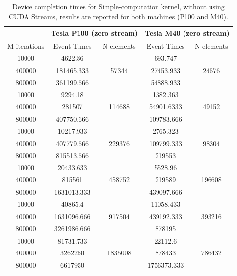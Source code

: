 \begin{table}	
	\centering
	\begin{tabular}{ | c ||  c | c  || c | c | } 
		\hline
		&  \multicolumn{2}{c}{\textbf{Tesla P100 (zero stream)}} & \multicolumn{2}{c}{\textbf{Tesla M40 (zero stream)}}\\ [0.5ex]
		\hline
		M iterations & Event Times & N elements    &    Event Times & N elements  \\
		\hline\hline
		
		
		10000 &	4622.86 &	\multirow{3}{*}{57344}&	693.747&	\multirow{3}{*}{24576}\\
		400000 & 181465.333&	&	27453.933&	\\
		800000 &	361199.666&	&	54888.933&	\\
		\hline
		10000 &	9294.18&	\multirow{3}{*}{114688}&	1382.363&	\multirow{3}{*}{49152}\\
		400000 &	281507 &	&	54901.6333&	\\
		800000 &	407750.666&	&	109783.666&	\\
		\hline
		10000 &	10217.933&	\multirow{3}{*}{229376}&	2765.323&	\multirow{3}{*}{98304}\\
		400000 &	407779.666&	&	109799.333&	\\
		800000 &	815513.666&	&	219553&	\\
		\hline
		10000 &	20433.633&	\multirow{3}{*}{458752}&	5528.96&	\multirow{3}{*}{196608}\\
		400000 &	815561&	&	219589&	\\
		800000 &	1631013.333&	&	439097.666&	\\
		\hline
		10000 &	40865.4&	\multirow{3}{*}{917504}&	11058.433&	\multirow{3}{*}{393216}\\
		400000 &	1631096.666&	&	439192.333&	\\
		800000 &	3261986.666&	&	878195&	\\
		\hline
		10000 &	81731.733&	\multirow{3}{*}{1835008}&	22112.6&	\multirow{3}{*}{786432}\\
		400000 &	3262250	& &	878433&	\\
		800000 &	6617950 &	&	1756373.333&	\\
		\hline
	\end{tabular}
	\caption{Device completion times for Simple-computation kernel, without using CUDA Streams, results are reported for both machines (P100 and M40).}	
	\label{tab:cosavgszero}		
\end{table}

